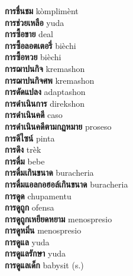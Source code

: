 \textbf{ การชื่นชม  } kòmplimènt \\
\textbf{ การช่วยเหลือ  } yuda \\
\textbf{ การซื้อขาย  } deal \\
\textbf{ การซื้อลอตเตอรี่  } bièchi \\
\textbf{ การซื้อหวย  } bièchi \\
\textbf{ การฌาปนกิจ  } kremashon \\
\textbf{ การฌาปนกิจศพ  } kremashon \\
\textbf{ การดัดแปลง  } adaptashon \\
\textbf{ การดำเนินการ  } direkshon \\
\textbf{ การดำเนินคดี  } caso \\
\textbf{ การดำเนินคดีตามกฏหมาย  } proseso \\
\textbf{ การดีไซน์  } pinta \\
\textbf{ การดึง  } trèk \\
\textbf{ การดื่ม  } bebe \\
\textbf{ การดื่มเกินขนาด  } buracheria \\
\textbf{ การดื่มแอลกอฮอล์เกินขนาด  } buracheria \\
\textbf{ การดูด  } chupamentu \\
\textbf{ การดูถูก  } ofensa \\
\textbf{ การดูถูกเหยียดหยาม  } menospresio \\
\textbf{ การดูหมิ่น  } menospresio \\
\textbf{ การดูแล  } yuda \\
\textbf{ การดูแลรักษา  } yuda \\
\textbf{ การดูแลเด็ก  } babysit (s.) \\
